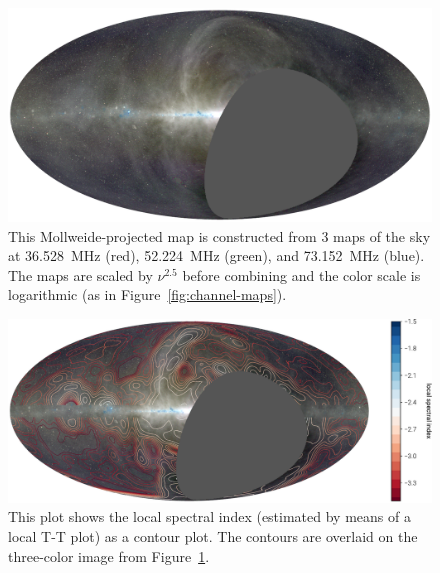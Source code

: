 \documentclass[twocolumn]{aastex61}
\begin{document}
\begin{figure}[t]
    \centering
    \includegraphics[width=\textwidth]{figures/spectral-index/ovro-lwa-sky-map.pdf}
    \caption{
        This Mollweide-projected map is constructed from 3 maps of the sky at 36.528~MHz (red),
        52.224~MHz (green), and 73.152~MHz (blue). The maps are scaled by $\nu^{2.5}$ before
        combining and the color scale is logarithmic (as in Figure~\ref{fig:channel-maps}).
    }
    \label{fig:three-color}
\end{figure}

\begin{figure}[t]
    \centering
    \includegraphics[width=\textwidth]{figures/spectral-index/internal-spectral-index}
    \caption{
        This plot shows the local spectral index (estimated by means of a local T-T plot) as a
        contour plot. The contours are overlaid on the three-color image from
        Figure~\ref{fig:three-color}.
    }
    \label{fig:internal-spectral-index}
\end{figure}
\end{document}
